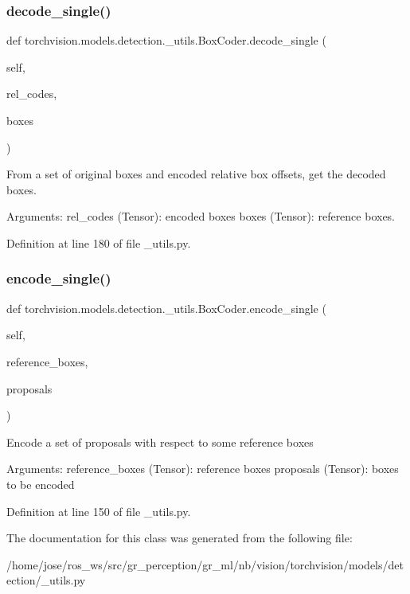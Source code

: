 \subsubsection{\texorpdfstring{decode\+\_\+single()}{decode\_single()}}
{\footnotesize\ttfamily def torchvision.\+models.\+detection.\+\_\+utils.\+Box\+Coder.\+decode\+\_\+single (\begin{DoxyParamCaption}\item[{}]{self,  }\item[{}]{rel\+\_\+codes,  }\item[{}]{boxes }\end{DoxyParamCaption})}

\begin{DoxyVerb}From a set of original boxes and encoded relative box offsets,
get the decoded boxes.

Arguments:
    rel_codes (Tensor): encoded boxes
    boxes (Tensor): reference boxes.
\end{DoxyVerb}
 

Definition at line 180 of file \+\_\+utils.\+py.

\mbox{\label{classtorchvision_1_1models_1_1detection_1_1__utils_1_1BoxCoder_a99b12af811b1fe21fb43c7b14777a1c2}} 
\subsubsection{\texorpdfstring{encode\+\_\+single()}{encode\_single()}}
{\footnotesize\ttfamily def torchvision.\+models.\+detection.\+\_\+utils.\+Box\+Coder.\+encode\+\_\+single (\begin{DoxyParamCaption}\item[{}]{self,  }\item[{}]{reference\+\_\+boxes,  }\item[{}]{proposals }\end{DoxyParamCaption})}

\begin{DoxyVerb}Encode a set of proposals with respect to some
reference boxes

Arguments:
    reference_boxes (Tensor): reference boxes
    proposals (Tensor): boxes to be encoded
\end{DoxyVerb}
 

Definition at line 150 of file \+\_\+utils.\+py.



The documentation for this class was generated from the following file\+:\begin{DoxyCompactItemize}
\item 
/home/jose/ros\+\_\+ws/src/gr\+\_\+perception/gr\+\_\+ml/nb/vision/torchvision/models/detection/\+\_\+utils.\+py\end{DoxyCompactItemize}
